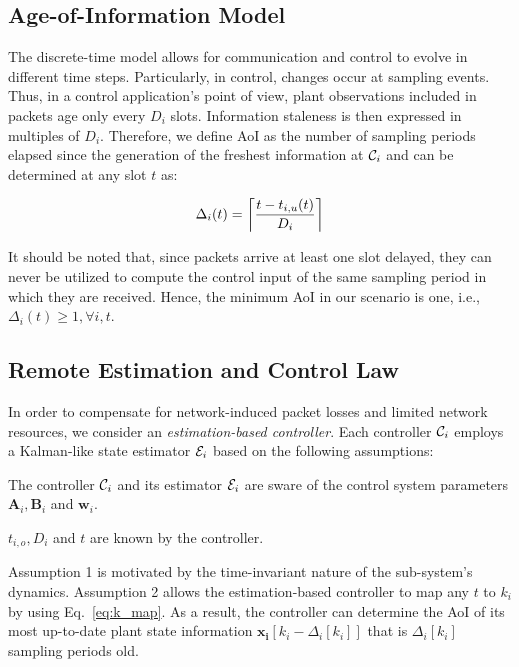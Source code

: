 \subsection{Age-of-Information Model}
The discrete-time model allows for communication and control to evolve in
different time steps. Particularly, in control, changes occur at sampling
events. Thus, in a control application's point of view, plant observations
included in packets age only every $D_i$ slots. Information staleness is then
expressed in multiples of $D_i$. Therefore, we define AoI as the number of
sampling periods elapsed since the generation of the freshest information at
$\mathcal{C}_i$ and can be determined at any slot $t$ as:

\begin{equation}
  \label{eq:aoi}
  \Delta_i(t) = \left\lceil \dfrac{t - t_{i,u}(t)}{D_{i}} \right\rceil 
\end{equation}

It should be noted that, since packets arrive at least one slot delayed, they
can never be utilized to compute the control input of the same sampling period
in which they are received. Hence, the minimum AoI in our scenario is one, i.e.,
$\Delta_i(t) \ge 1,\forall i,t$.

\subsection{Remote Estimation and Control Law}
In order to compensate for network-induced packet losses and limited network
resources, we consider an \textit{estimation-based controller}. Each controller
$\mathcal{C}_i$ employs a Kalman-like state estimator $\mathcal{E}_i$ based on the
following assumptions:

\begin{theorem}
  The controller $\mathcal{C}_i$ and its estimator $\mathcal{E}_i$ are sware of the
  control system parameters $\boldsymbol{A}_i, \boldsymbol{B}_i$ and
  $\boldsymbol{w}_i$.
\end{theorem}

\begin{theorem}
  $t_{i,o}, D_i$ and $t$ are known by the controller. 
\end{theorem}

Assumption 1 is motivated by the time-invariant nature of the sub-system's
dynamics. Assumption 2 allows the estimation-based controller to map any $t$ to
$k_i$ by using Eq.~\eqref{eq:k_map}. As a result, the controller can determine
the AoI of its most up-to-date plant state information $\boldsymbol{x_i}[k_i -
\Delta_i[k_i]]$ that is $\Delta_i[k_i]$ sampling periods old.

